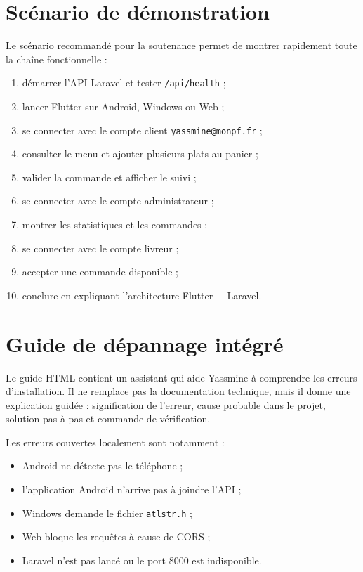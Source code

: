 \documentclass[12pt,a4paper]{report}
\begin{document}
\section{Scénario de démonstration}
Le scénario recommandé pour la soutenance permet de montrer rapidement toute la chaîne fonctionnelle :
\begin{enumerate}
  \item démarrer l'API Laravel et tester \texttt{/api/health} ;
  \item lancer Flutter sur Android, Windows ou Web ;
  \item se connecter avec le compte client \texttt{yassmine@monpf.fr} ;
  \item consulter le menu et ajouter plusieurs plats au panier ;
  \item valider la commande et afficher le suivi ;
  \item se connecter avec le compte administrateur ;
  \item montrer les statistiques et les commandes ;
  \item se connecter avec le compte livreur ;
  \item accepter une commande disponible ;
  \item conclure en expliquant l'architecture Flutter + Laravel.
\end{enumerate}

\section{Guide de dépannage intégré}
Le guide HTML contient un assistant qui aide Yassmine à comprendre les erreurs d'installation. Il ne remplace pas la documentation technique, mais il donne une explication guidée : signification de l'erreur, cause probable dans le projet, solution pas à pas et commande de vérification.

Les erreurs couvertes localement sont notamment :
\begin{itemize}
  \item Android ne détecte pas le téléphone ;
  \item l'application Android n'arrive pas à joindre l'API ;
  \item Windows demande le fichier \texttt{atlstr.h} ;
  \item Web bloque les requêtes à cause de CORS ;
  \item Laravel n'est pas lancé ou le port 8000 est indisponible.
\end{itemize}
\end{document}

